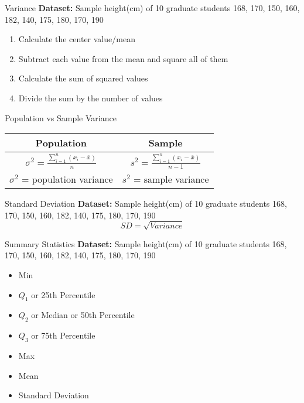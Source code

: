 \begin{frame}[t]{Variance}
	\textbf{Dataset:} Sample height(cm) of 10 graduate students 168, 170, 
	150, 160, 182, 140, 175, 180, 170, 190
	\begin{enumerate}
		\item Calculate the center value/mean 
		\item Subtract each value from the mean and square all of them
		\item Calculate the sum of squared values 
		\item Divide the sum by the number of values 
	\end{enumerate}
\end{frame}

\begin{frame}[t]{Population vs Sample Variance}
	\begin{center}
		\begin{tabular}{|c|c|} 
			\hline 
			Population & Sample \\ 
			\hline 
			$\sigma^2  = \frac{\sum_{i=1}^{n} (x_i - \overline{x}) }{n}$ & 
			$ s^2  = 
			\frac{\sum_{i=1}^{n} 
				(x_i - \overline{x}) }{n-1}$ \\
			\hline
			$\sigma^2$ =  population variance  & $s^2$ = sample variance\\ 
			\hline 
		\end{tabular}
	\end{center}
\end{frame}


\begin{frame}[t]{Standard Deviation}
	\textbf{Dataset:} Sample height(cm) of 10 graduate students 168, 170, 
	150, 160, 182, 140, 175, 180, 170, 190
	$$
	SD = \sqrt{Variance}
	$$ 
\end{frame}

\begin{frame}[t]{Summary Statistics}
	\textbf{Dataset:} Sample height(cm) of 10 graduate students 168, 170, 
	150, 160, 182, 140, 175, 180, 170, 190
	
	\begin{itemize}
		\item Min
		\item $Q_1$ or 25th Percentile 
		\item $Q_2$ or Median or 50th Percentile
		\item $Q_3$ or 75th Percentile 
		\item Max
		\item Mean 
		\item Standard Deviation
	\end{itemize}
\end{frame}



